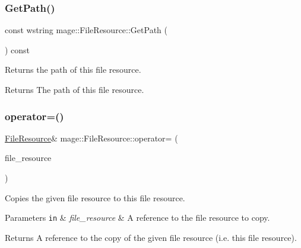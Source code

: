 \subsubsection{\texorpdfstring{Get\+Path()}{GetPath()}}
{\footnotesize\ttfamily const wstring mage\+::\+File\+Resource\+::\+Get\+Path (\begin{DoxyParamCaption}{ }\end{DoxyParamCaption}) const}

Returns the path of this file resource.

\begin{DoxyReturn}{Returns}
The path of this file resource. 
\end{DoxyReturn}
\hypertarget{classmage_1_1_file_resource_a195da42fa3a40991e7c38cf8305b0bf2}{}\label{classmage_1_1_file_resource_a195da42fa3a40991e7c38cf8305b0bf2} 
\subsubsection{\texorpdfstring{operator=()}{operator=()}\hspace{0.1cm}{\footnotesize\ttfamily [1/2]}}
{\footnotesize\ttfamily \hyperlink{classmage_1_1_file_resource}{File\+Resource}\& mage\+::\+File\+Resource\+::operator= (\begin{DoxyParamCaption}\item[{const \hyperlink{classmage_1_1_file_resource}{File\+Resource} \&}]{file\+\_\+resource }\end{DoxyParamCaption})\hspace{0.3cm}{\ttfamily [delete]}}

Copies the given file resource to this file resource.


\begin{DoxyParams}[1]{Parameters}
\mbox{\tt in}  & {\em file\+\_\+resource} & A reference to the file resource to copy. \\
\hline
\end{DoxyParams}
\begin{DoxyReturn}{Returns}
A reference to the copy of the given file resource (i.\+e. this file resource). 
\end{DoxyReturn}
\hypertarget{classmage_1_1_file_resource_a7ec207d6e9cb0bc4b8020aa73df986b6}{}\label{classmage_1_1_file_resource_a7ec207d6e9cb0bc4b8020aa73df986b6} 
